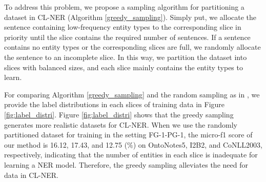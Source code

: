 \documentclass[11pt]{article}
\begin{document}
To address this problem, we propose a sampling algorithm for partitioning a dataset in CL-NER (Algorithm \ref{greedy_sampling}).
Simply put, we allocate the sentence containing low-frequency entity types to the corresponding slice in priority until the slice contains the required number of sentences.
If a sentence contains no entity types or the corresponding slices are full, we randomly allocate the sentence to an incomplete slice.
In this way, we partition the dataset into slices with balanced sizes, and each slice mainly contains the entity types to learn.

For comparing Algorithm \ref{greedy_sampling} and the random sampling as in \citet{monaikul2021continual}, we provide the label distributions in each slices of training data in Figure \ref{fig:label_distri}.
Figure \ref{fig:label_distri} shows that the greedy sampling generates more realistic datasets for CL-NER.
When we use the randomly partitioned dataset for training in the setting FG-1-PG-1, the micro-f1 score of our method is 16.12, 17.43, and 12.75 (\%) on OntoNotes5, I2B2, and CoNLL2003, respectively, indicating that the number of entities in each slice is inadequate for learning a NER model.
Therefore, the greedy sampling alleviates the need for data in CL-NER.
\end{document}
